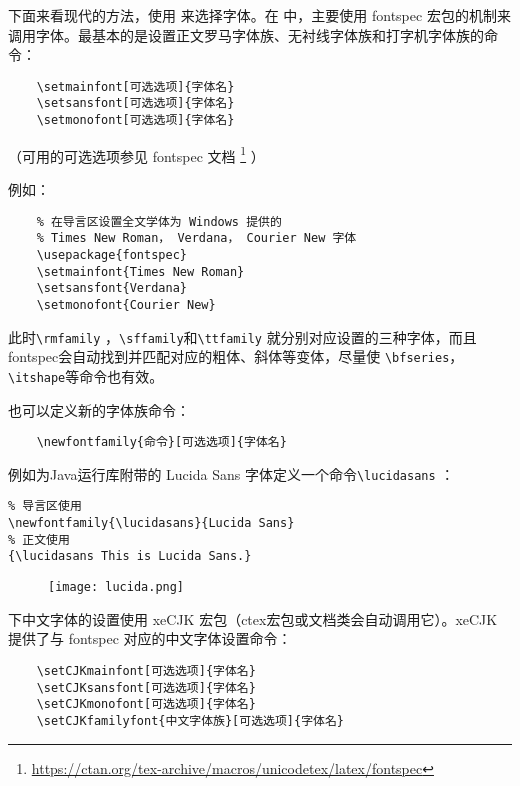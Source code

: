 下面来看现代的方法，使用 \XeTeX 来选择字体。在 \XeLaTeX 中，主要使用 fontspec 宏包的机制来调用字体。最基本的是设置正文罗马字体族、无衬线字体族和打字机字体族的命令：

\begin{lstlisting}
    \setmainfont[可选选项]{字体名}
    \setsansfont[可选选项]{字体名}
    \setmonofont[可选选项]{字体名}
\end{lstlisting}

（可用的可选选项参见 fontspec 文档 \footnote{\href{https://ctan.org/tex-archive/macros/unicodetex/latex/fontspec}{https://ctan.org/tex-archive/macros/unicodetex/latex/fontspec}} ）

例如：
\begin{lstlisting}
    % 在导言区设置全文学体为 Windows 提供的
    % Times New Roman， Verdana， Courier New 字体
    \usepackage{fontspec}
    \setmainfont{Times New Roman}
    \setsansfont{Verdana}
    \setmonofont{Courier New}
\end{lstlisting}

此时\verb|\rmfamily| ，\verb|\sffamily|和\verb|\ttfamily| 就分别对应设置的三种字体，而且 fontspec会自动找到并匹配对应的粗体、斜体等变体，尽量使 \verb|\bfseries|，\verb|\itshape|等命令也有效。

也可以定义新的字体族命令：
\begin{lstlisting}
    \newfontfamily{命令}[可选选项]{字体名}
\end{lstlisting}

例如为Java运行库附带的 Lucida Sans 字体定义一个命令\verb|\lucidasans| ：

\begin{minipage}[t]{0.45\textwidth}
\begin{lstlisting}
% 导言区使用
\newfontfamily{\lucidasans}{Lucida Sans}
% 正文使用
{\lucidasans This is Lucida Sans.}
\end{lstlisting}
\end{minipage}
\hfill
\begin{minipage}[t]{0.45\textwidth}
\begin{figure}[H]
    \centering
    \texttt{[image: lucida.png]}
\end{figure}
\end{minipage}

\XeLaTeX 下中文字体的设置使用 xeCJK 宏包（ctex宏包或文档类会自动调用它）。xeCJK 提供了与 fontspec 对应的中文字体设置命令：
\begin{lstlisting}
    \setCJKmainfont[可选选项]{字体名}
    \setCJKsansfont[可选选项]{字体名}
    \setCJKmonofont[可选选项]{字体名}
    \setCJKfamilyfont{中文字体族}[可选选项]{字体名}
\end{lstlisting}

